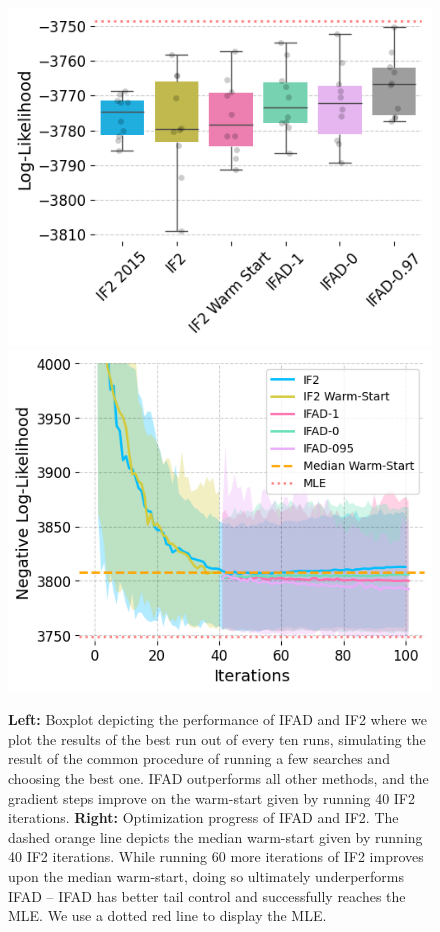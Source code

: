 \documentclass[9pt,twocolumn,twoside]{pnas-new}
\begin{document}
\begin{figure}[ht]
    \includegraphics[width=\textwidth/\real{4.2}]{../imgs/095/boxplot.png}
    \includegraphics[width=\textwidth/\real{4.2}]{../imgs/095/optim.png}
    \caption{\textbf{Left:} Boxplot depicting the performance of IFAD and IF2 where we plot the results of the best run out of every ten runs, simulating the result of the common procedure of running a few searches and choosing the best one. IFAD outperforms all other methods, and the gradient steps improve on the warm-start given by running 40 IF2 iterations. 
    \textbf{Right:} Optimization progress of IFAD and IF2. The dashed orange line depicts the median warm-start given by running 40 IF2 iterations. While running 60 more iterations of IF2 improves upon the median warm-start, doing so ultimately underperforms IFAD -- IFAD has better tail control and successfully reaches the MLE. 
    We use a dotted red line to display the MLE.}
    \label{fig:boxplot-search}
\end{figure}
\end{document}
